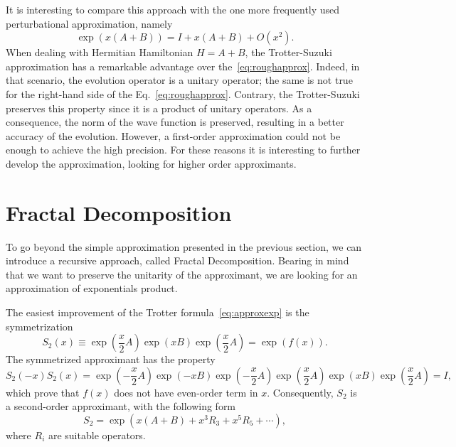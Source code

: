 It is interesting to compare this approach with the one more frequently used perturbational approximation, namely
\begin{equation} \label{eq:roughapprox}
\exp\left({x(A+B)}\right) = I + x(A+B) + O(x^2).
\end{equation}
When dealing with Hermitian Hamiltonian $H=A+B$, the Trotter-Suzuki approximation has a remarkable advantage over the~\eqref{eq:roughapprox}. Indeed, in that scenario, the evolution operator is a unitary operator; the same is not true for the right-hand side of the Eq.~\eqref{eq:roughapprox}. Contrary, the Trotter-Suzuki preserves this property since it is a product of unitary operators. As a consequence, the norm of the wave function is preserved, resulting in a better accuracy of the evolution. However, a first-order approximation could not be enough  to achieve the high precision. For these reasons it is interesting to further develop the approximation, looking for higher order approximants.

\section{Fractal Decomposition}
To go beyond the simple approximation presented in the previous section, we can introduce a recursive approach, called Fractal Decomposition. Bearing in mind that we want to preserve the unitarity of the approximant, we are looking for an approximation of exponentials product.

The easiest improvement of the Trotter formula~\eqref{eq:approxexp} is the symmetrization
\begin{equation} 
S_2(x) \equiv \exp\left({\frac{x}{2}A}\right) \exp\left({xB}\right) \exp\left({\frac{x}{2}A}\right) = \exp\left({f(x)}\right).
\end{equation}
The symmetrized approximant has the property
\begin{equation}
S_2(-x) S_2(x) = \exp\left({-\frac{x}{2}A}\right) \exp\left({-xB}\right) \exp\left({-\frac{x}{2}A}\right) \exp\left({\frac{x}{2}A}\right) \exp\left({xB}\right) \exp\left({\frac{x}{2}A}\right) = I, \nonumber
\end{equation}
which prove that $f(x)$ does not have even-order term in $x$. Consequently, $S_2$ is a second-order approximant, with the following form
\begin{equation} \label{eq:S2-form}
S_2 = \exp\left({x(A+B) + x^3R_3 + x^5R_5 + \cdots}\right),
\end{equation}
where $R_i$ are suitable operators.

